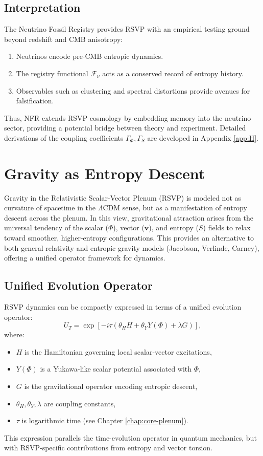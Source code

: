 \documentclass[12pt]{report}
\begin{document}
\section{Interpretation}
The Neutrino Fossil Registry provides RSVP with an empirical testing ground beyond redshift and CMB anisotropy:
\begin{enumerate}
    \item Neutrinos encode pre-CMB entropic dynamics.
    \item The registry functional \(\mathcal{F}_\nu\) acts as a conserved record of entropy history.
    \item Observables such as clustering and spectral distortions provide avenues for falsification.
\end{enumerate}
Thus, NFR extends RSVP cosmology by embedding memory into the neutrino sector, providing a potential bridge between theory and experiment. Detailed derivations of the coupling coefficients \(\Gamma_\Phi, \Gamma_S\) are developed in Appendix \ref{app:H}.

\chapter{Gravity as Entropy Descent}
\label{chap:gravity-entropy}
Gravity in the Relativistic Scalar-Vector Plenum (RSVP) is modeled not as curvature of spacetime in the \(\Lambda\)CDM sense, but as a manifestation of entropy descent across the plenum. In this view, gravitational attraction arises from the universal tendency of the scalar (\(\Phi\)), vector (\(\mathbf{v}\)), and entropy (\(S\)) fields to relax toward smoother, higher-entropy configurations. This provides an alternative to both general relativity and entropic gravity models (Jacobson, Verlinde, Carney), offering a unified operator framework for dynamics.

\section{Unified Evolution Operator}
RSVP dynamics can be compactly expressed in terms of a unified evolution operator:
\begin{equation}
U_T = \exp\left[-i \tau \left(\theta_H H + \theta_Y Y(\Phi) + \lambda G\right)\right], \label{eq:unified}
\end{equation}
where:
\begin{itemize}
    \item \(H\) is the Hamiltonian governing local scalar-vector excitations,
    \item \(Y(\Phi)\) is a Yukawa-like scalar potential associated with \(\Phi\),
    \item \(G\) is the gravitational operator encoding entropic descent,
    \item \(\theta_H, \theta_Y, \lambda\) are coupling constants,
    \item \(\tau\) is logarithmic time (see Chapter \ref{chap:core-plenum}).
\end{itemize}
This expression parallels the time-evolution operator in quantum mechanics, but with RSVP-specific contributions from entropy and vector torsion.
\end{document}
